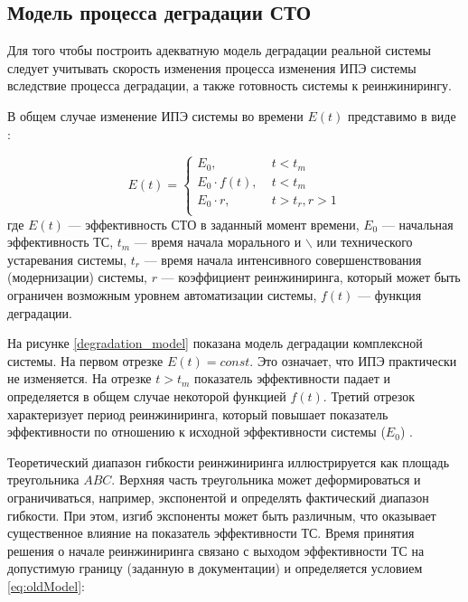\subsection{Модель процесса деградации СТО}
Для того чтобы построить адекватную модель деградации реальной системы следует учитывать скорость изменения процесса изменения ИПЭ системы вследствие процесса деградации, а также готовность системы к реинжинирингу. 

В общем случае изменение ИПЭ системы во времени $E(t)$ представимо в виде \cite{Doronina}:

\vspace{\baselineskip}
\begin{equation} \label{eq:oldModel}
    E(t) = \begin{cases}
        E_0,            & \; t<t_m         \\
        E_0 \cdot f(t), & \; t<t_m         \\
        E_0 \cdot r,          & \; t>t_r, r>1 \\
    \end{cases}
\end{equation}
где $E(t)$ --- эффективность СТО в заданный момент времени,
$E_0$ --- начальная эффективность ТС, 
$t_m$ --- время начала морального и $\backslash$ или технического устаревания системы,
$t_r$ --- время начала интенсивного совершенствования (модернизации) системы,
$r$ --- коэффициент реинжиниринга, который может быть ограничен возможным уровнем автоматизации системы,
$f(t)$ --- функция деградации.

На рисунке \ref{degradation_model} показана модель деградации комплексной системы. 
На первом отрезке $E(t) = const$. 
Это означает, что ИПЭ практически не изменяется. 
На отрезке $t > t_m$ показатель эффективности падает и определяется в общем случае некоторой функцией $f(t)$. 
Третий отрезок характеризует период реинжиниринга, который повышает показатель эффективности по отношению к исходной эффективности системы ($E_0$) \cite{Doronina}.


Теоретический диапазон гибкости реинжиниринга иллюстрируется как площадь треугольника $ABC$. 
Верхняя часть треугольника может деформироваться и ограничиваться, например, экспонентой и определять фактический диапазон гибкости. 
При этом, изгиб экспоненты может быть различным, что оказывает существенное влияние на показатель эффективности ТС. 
Время принятия решения о начале реинжиниринга связано с выходом эффективности ТС на допустимую границу (заданную в документации) и определяется условием \ref{eq:oldModel}:

